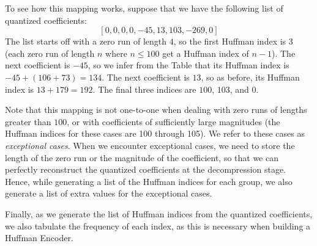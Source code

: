 To see how this mapping works, suppose that we have the following list of quantized coefficients:
\[
[0, 0, 0, 0, -45, 13, 103, -269, 0]
\]
The list starts off with a zero run of length $4$, so the first Huffman index is $3$
(each zero run of length $n$ where $n\leq 100$ get a Huffman index of $n-1$).
The next coefficient is $-45$, so we infer from the Table that its Huffman index
is $-45 + (106+73) = 134$.
The next coefficient is $13$, so as before, its Huffman index is $13 + 179 = 192$.
The final three indices are $100$, $103$, and $0$.

Note that this mapping is not one-to-one when dealing with zero runs of lengths greater than $100$,
or with coefficients of sufficiently large magnitudes (the Huffman indices for these cases
are 100 through 105).
We refer to these cases as \emph{exceptional cases}.
When we encounter exceptional cases, we need to
store the length of the zero run or the magnitude of the coefficient, so that we can perfectly
reconstruct the quantized coefficients at the decompression stage.
Hence, while generating a list of the Huffman indices for each group, we also generate a list
of extra values for the exceptional cases.

Finally, as we generate the list of Huffman indices from the quantized coefficients, we also tabulate
the frequency of each index, as this is necessary when building a Huffman Encoder.

